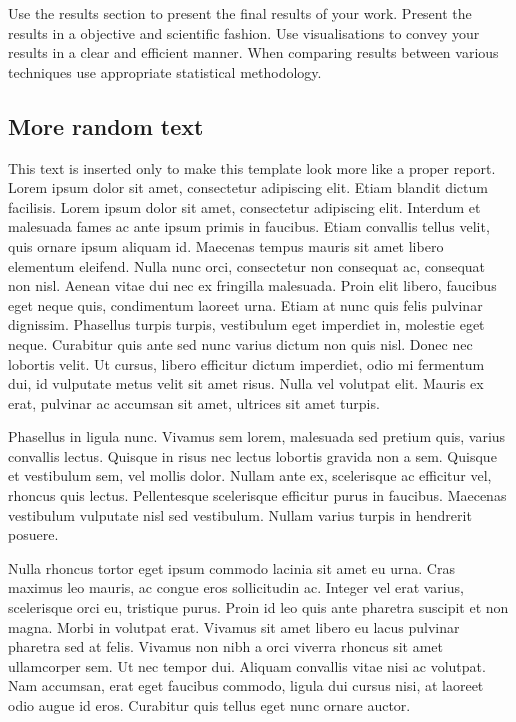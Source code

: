 \documentclass[fleqn,moreauthors,10pt]{ds_report}
\begin{document}
Use the results section to present the final results of your work. Present the results in a objective and scientific fashion. Use visualisations to convey your results in a clear and efficient manner. When comparing results between various techniques use appropriate statistical methodology.

\subsection*{More random text}

This text is inserted only to make this template look more like a proper report. Lorem ipsum dolor sit amet, consectetur adipiscing elit. Etiam blandit dictum facilisis. Lorem ipsum dolor sit amet, consectetur adipiscing elit. Interdum et malesuada fames ac ante ipsum primis in faucibus. Etiam convallis tellus velit, quis ornare ipsum aliquam id. Maecenas tempus mauris sit amet libero elementum eleifend. Nulla nunc orci, consectetur non consequat ac, consequat non nisl. Aenean vitae dui nec ex fringilla malesuada. Proin elit libero, faucibus eget neque quis, condimentum laoreet urna. Etiam at nunc quis felis pulvinar dignissim. Phasellus turpis turpis, vestibulum eget imperdiet in, molestie eget neque. Curabitur quis ante sed nunc varius dictum non quis nisl. Donec nec lobortis velit. Ut cursus, libero efficitur dictum imperdiet, odio mi fermentum dui, id vulputate metus velit sit amet risus. Nulla vel volutpat elit. Mauris ex erat, pulvinar ac accumsan sit amet, ultrices sit amet turpis.

Phasellus in ligula nunc. Vivamus sem lorem, malesuada sed pretium quis, varius convallis lectus. Quisque in risus nec lectus lobortis gravida non a sem. Quisque et vestibulum sem, vel mollis dolor. Nullam ante ex, scelerisque ac efficitur vel, rhoncus quis lectus. Pellentesque scelerisque efficitur purus in faucibus. Maecenas vestibulum vulputate nisl sed vestibulum. Nullam varius turpis in hendrerit posuere.

Nulla rhoncus tortor eget ipsum commodo lacinia sit amet eu urna. Cras maximus leo mauris, ac congue eros sollicitudin ac. Integer vel erat varius, scelerisque orci eu, tristique purus. Proin id leo quis ante pharetra suscipit et non magna. Morbi in volutpat erat. Vivamus sit amet libero eu lacus pulvinar pharetra sed at felis. Vivamus non nibh a orci viverra rhoncus sit amet ullamcorper sem. Ut nec tempor dui. Aliquam convallis vitae nisi ac volutpat. Nam accumsan, erat eget faucibus commodo, ligula dui cursus nisi, at laoreet odio augue id eros. Curabitur quis tellus eget nunc ornare auctor.
\end{document}
